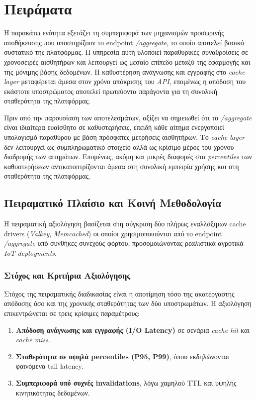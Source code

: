 \chapter{Πειράματα}
\label{chap:experiments}

Η παρακάτω ενότητα εξετάζει τη συμπεριφορά των μηχανισμών προσωρινής
αποθήκευσης που υποστηρίζουν το endpoint \textit{/aggregate}, το οποίο αποτελεί
βασικό συστατικό της πλατφόρμας. Η υπηρεσία αυτή υλοποιεί παραθυρικές
συναθροίσεις σε χρονοσειρές αισθητήρων και λειτουργεί ως μεσαίο επίπεδο μεταξύ
της εφαρμογής και της μόνιμης βάσης δεδομένων. Η καθυστέρηση ανάγνωσης και
εγγραφής στο \textit{cache layer} μεταφέρεται άμεσα στον χρόνο απόκρισης του
\textit{API}, επομένως η απόδοση του εκάστοτε υποστρώματος αποτελεί πρωτεύοντα
παράγοντα για τη συνολική σταθερότητα της πλατφόρμας.

Πριν από την παρουσίαση των αποτελεσμάτων, αξίζει να σημειωθεί ότι το
\textit{/aggregate} είναι ιδιαίτερα ευαίσθητο σε καθυστερήσεις, επειδή κάθε
αίτημα ενεργοποιεί υπολογισμό παραθύρου με βάση πρόσφατες μετρήσεις αισθητήρων.
Το \textit{cache layer} δεν λειτουργεί ως συμπληρωματικό στοιχείο αλλά ως
κρίσιμο μέρος του χρόνου διαδρομής των αιτημάτων. Επομένως, ακόμη και μικρές
διαφορές στα \textit{percentiles} των καθυστερήσεων αντικατοπτρίζονται άμεσα
στη συνολική εμπειρία χρήσης και στη σταθερότητα της πλατφόρμας.

\section{Πειραματικό Πλαίσιο και Κοινή Μεθοδολογία}

Η πειραματική αξιολόγηση βασίζεται στη σύγκριση δύο πλήρως εναλλάξιμων cache
drivers (\textit{Valkey}, \textit{Memcached}) οι οποίοι χρησιμοποιούνται από το
endpoint \textit{/aggregate} υπό συνθήκες συνεχούς φόρτου, προσομοιώνοντας
ρεαλιστικά αγροτικά \textit{IoT deployments}.

\subsection{Στόχος και Κριτήρια Αξιολόγησης}

Στόχος της πειραματικής διαδικασίας είναι η αποτίμηση τόσο της ακατέργαστης
απόδοσης όσο και της χρονικής σταθερότητας των δύο υποστρωμάτων. Η αξιολόγηση
επικεντρώνεται σε τρεις κρίσιμες παραμέτρους:

\begin{enumerate}
	\item \textbf{Απόδοση ανάγνωσης και εγγραφής (I/O Latency)} σε σενάρια
	      \textit{cache hit} και \textit{cache miss}.
	\item \textbf{Σταθερότητα σε υψηλά percentiles (P95, P99)}, όπου
	      εκδηλώνονται φαινόμενα tail latency.
	\item \textbf{Συμπεριφορά υπό συχνές invalidations}, λόγω χαμηλού TTL
	      και υψηλής κινητικότητας δεδομένων.
\end{enumerate}

